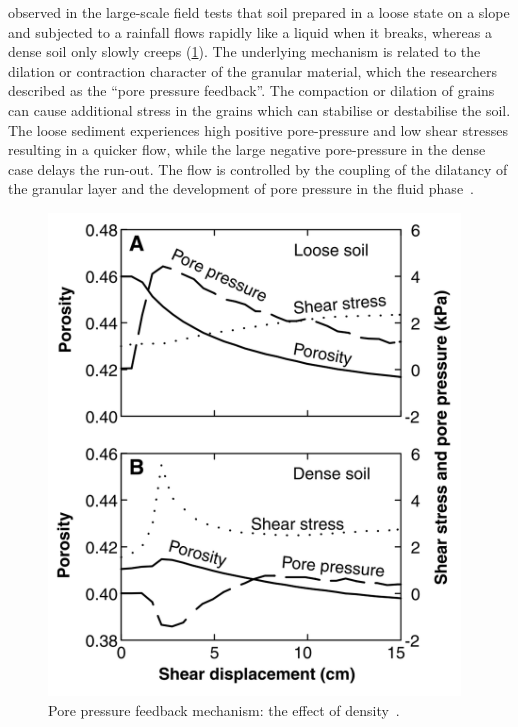 \citet{Iverson2000} observed in the 
large-scale field tests that soil prepared in a loose state on a slope and 
subjected to a rainfall flows rapidly like a liquid when it breaks, whereas a 
dense soil only slowly creeps (\cref{fig:iverson_pwp}). The underlying 
mechanism is related to the dilation or contraction character of the granular 
material, which the researchers described as the ``pore pressure feedback''. 
The 
compaction or dilation of grains can cause additional stress in the grains 
which can stabilise or destabilise the soil. The loose sediment experiences 
high 
positive pore-pressure and low shear stresses resulting in a quicker flow, 
while the large negative pore-pressure in the dense case delays the run-out. 
The flow is controlled by the coupling of the dilatancy of the granular 
layer and the development of pore pressure in the 
fluid phase~\citep{Pailha2008}. 
%
\begin{figure}[tbhp]
	\centering
	\includegraphics[width=0.975\textwidth]{iverson_pwp}
	\caption{Pore pressure feedback mechanism: the effect of 
	density~\citep{Iverson2000}.}
	\label{fig:iverson_pwp}
\end{figure}

